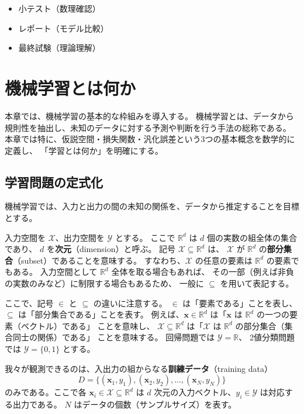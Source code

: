 \begin{itemize}
  \item 小テスト（数理確認）
  \item レポート（モデル比較）
  \item 最終試験（理論理解）
\end{itemize}


\pagebreak

\section{機械学習とは何か}

本章では、機械学習の基本的な枠組みを導入する。
機械学習とは、データから規則性を抽出し、未知のデータに対する予測や判断を行う手法の総称である。
本章では特に、仮説空間・損失関数・汎化誤差という3つの基本概念を数学的に定義し、
「学習とは何か」を明確にする。


\subsection{学習問題の定式化}

機械学習では、入力と出力の間の未知の関係を、データから推定することを目標とする。

入力空間を $\mathcal{X}$、出力空間を $\mathcal{Y}$ とする。
ここで $\mathbb{R}^d$ は $d$ 個の実数の組全体の集合であり、
$d$ を\textbf{次元}（dimension）と呼ぶ。
記号 $\mathcal{X} \subseteq \mathbb{R}^d$ は、
$\mathcal{X}$ が $\mathbb{R}^d$ の\textbf{部分集合}（subset）であることを意味する。
すなわち、$\mathcal{X}$ の任意の要素は $\mathbb{R}^d$ の要素でもある。
入力空間として $\mathbb{R}^d$ 全体を取る場合もあれば、
その一部（例えば非負の実数のみなど）に制限する場合もあるため、
一般に $\subseteq$ を用いて表記する。

ここで、記号 $\in$ と $\subseteq$ の違いに注意する。
$\in$ は「要素である」ことを表し、$\subseteq$ は「部分集合である」ことを表す。
例えば、$\bm{x} \in \mathbb{R}^d$ は「$\bm{x}$ は $\mathbb{R}^d$ の一つの要素（ベクトル）である」
ことを意味し、
$\mathcal{X} \subseteq \mathbb{R}^d$ は「$\mathcal{X}$ は $\mathbb{R}^d$ の部分集合（集合同士の関係）である」
ことを意味する。
回帰問題では $\mathcal{Y} = \mathbb{R}$、
2値分類問題では $\mathcal{Y} = \{0, 1\}$ とする。

我々が観測できるのは、入出力の組からなる\textbf{訓練データ}（training data）
\begin{equation}
  D = \{(\bm{x}_1, y_1), (\bm{x}_2, y_2), \ldots, (\bm{x}_N, y_N)\}
\end{equation}
のみである。ここで各 $\bm{x}_i \in \mathcal{X} \subseteq \mathbb{R}^d$ は
$d$ 次元の入力ベクトル、$y_i \in \mathcal{Y}$ は対応する出力である。
$N$ はデータの個数（サンプルサイズ）を表す。

